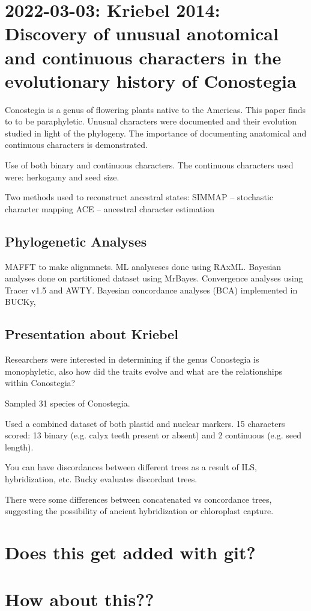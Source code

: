 \documentclass{article}
\begin{document}
\section{2022-03-03: Kriebel 2014: Discovery of unusual anotomical and
  continuous characters in the evolutionary history of Conostegia}

Conostegia is a genus of flowering plants native to the Americas. This paper
finds to to be paraphyletic. Unusual characters were documented and their
evolution studied in light of the phylogeny. The importance of documenting
anatomical and continuous characters is demonstrated.

Use of both binary and continuous characters. The continuous characters used were: herkogamy and seed size.

Two methods used to reconstruct ancestral states:
SIMMAP -- stochastic character mapping
ACE -- ancestral character estimation

\subsection{Phylogenetic Analyses}
MAFFT to make alignmnets. ML analyseses done using RAxML. Bayesian analyses done
on partitioned dataset using MrBayes. Convergence analyses using Tracer v1.5 and
AWTY. Bayesian concordance analyses (BCA) implemented in BUCKy,

\subsection{Presentation about Kriebel}

Researchers were interested in determining if the genus Conostegia is monophyletic, also how did the traits evolve and what are the relationships within Conostegia?

Sampled 31 species of Conostegia.

Used a combined dataset of both plastid and nuclear markers. 15 characters scored: 13 binary (e.g. calyx teeth present or absent) and 2 continuous (e.g. seed length). 

You can have discordances between different trees as a result of ILS, hybridization, etc. Bucky evaluates discordant trees.

There were some differences between concatenated vs concordance trees, suggesting the possibility of ancient hybridization or chloroplast capture.

\section{Does this get added with git?}
\section{How about this??}
\end{document}
